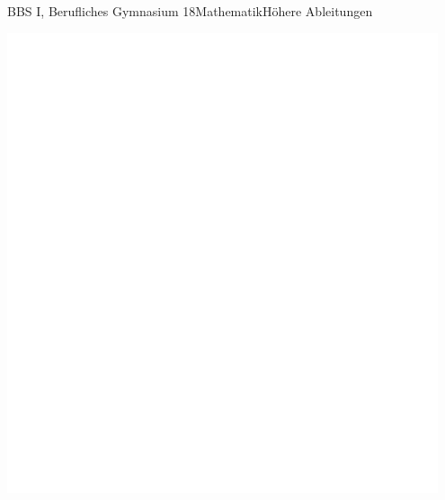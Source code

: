 \documentclass[oneside,openany,headings=optiontotoc,11pt,numbers=noenddot]{scrreprt}
\begin{document}
\begin{worksheet}{BBS I, Berufliches Gymnasium 18}{Mathematik}{Höhere Ableitungen}
\begin{framed}
				\par\noindent
				\includegraphics[width=0.95\textwidth]{../../empty.jpg}\\
			\end{framed}
		\end{worksheet}
\end{document}
